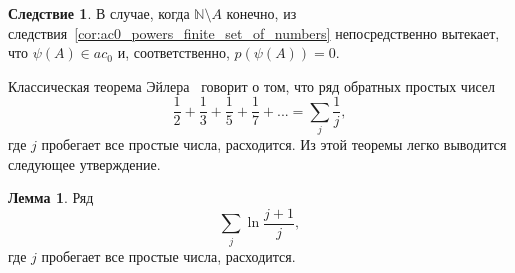 \documentclass[a4paper,openbib]{article}
\theoremstyle{definition}
\newtheorem{lemma}{Лемма}[section]
\newtheorem{corollary}{Следствие}[lemma]
\begin{document}
\begin{corollary}
	В случае, когда $\mathbb{N}\setminus A$ конечно, из следствия~\ref{cor:ac0_powers_finite_set_of_numbers} непосредственно вытекает, что $\psi(A)\in ac_0$
	и, соответственно, $p(\psi(A))=0$.
\end{corollary}



Классическая теорема Эйлера~\cite{euler1737variae} говорит о том, что
ряд обратных простых чисел
\begin{equation}
	\frac{1}{2} + \frac{1}{3} + \frac{1}{5} + \frac{1}{7} + ...
	=
	\sum_j \frac{1}{j},
\end{equation}
где $j$ пробегает все простые числа, расходится.
Из этой теоремы легко выводится следующее утверждение.

\begin{lemma}
	\label{cor:ac0_primes_sum_ln_diverges}
	Ряд
	\begin{equation}
		\sum_j \ln \frac{j+1}{j}
		,
	\end{equation}
	где $j$ пробегает все простые числа, расходится.
\end{lemma}
\end{document}
